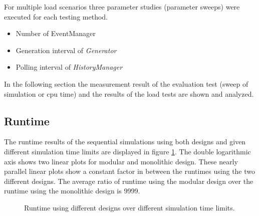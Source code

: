 For multiple load scenarios three parameter studies (parameter sweeps) were executed for each testing method.

\begin{itemize}
    \item Number of EventManager
    \item Generation interval of \emph{Generator}
    \item Polling interval of \emph{HistoryManager}
\end{itemize}

In the following section the measurement result of the evaluation test (sweep of simulation or cpu time) and the results of the load tests are shown and analyzed.

\subsection{Runtime}
\label{sec:measurements_sequential_runtime}

The runtime results of the sequential simulations using both designs and given different simulation time limits are displayed in figure \ref{fig:results_runtime_sim_time}.
The double logarithmic axis shows two linear plots for modular and monolithic design.
These nearly parallel linear plots show a constant factor in between the runtimes using the two different designs.
The average ratio of runtime using the modular design over the runtime using the monolithic design is 9999. %
\\


\begin{figure}
    \centering
    \caption{Runtime using different designs over different simulation time limits.}
    \label{fig:results_runtime_sim_time}
\end{figure}


